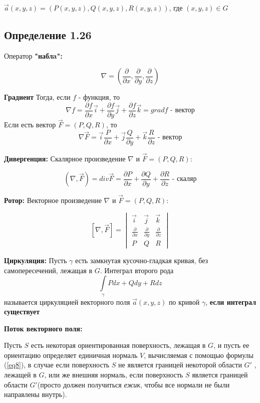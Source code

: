 \documentclass[12pt]{article}
\begin{document}
	$\vec{a}(x,y,z) = (P(x,y,z) , Q(x,y,z), R(x,y,z))$, где $(x,y,z) \in G$
	
\subsection*{Определение 1.26}
Оператор \textbf{"наблa":}
	
	

	$$\nabla = ( \frac{\partial}{\partial x} ,  \frac{\partial}{\partial y} , \frac{\partial}{\partial z})$$
	
\textbf{Градиент}
	Тогда, если $f$ - функция, то  
	$$\nabla f =   \frac{\partial f}{\partial x} \vec{i} +  \frac{\partial f}{\partial y}\vec{j} + \frac{\partial f}{\partial z} \vec{k}= grad f \text{ - вектор}$$ 
 	Если есть вектор $\vec{F} = (P, Q, R)$, то
 		$$\nabla \vec{F} = \vec{i}  \frac{P}{\partial x} + \vec{j} \frac{Q}{\partial y} + \vec{k}\frac{R}{\partial z} \text{ - вектор}$$ 
	
\textbf{Дивергенция:}
	Скалярное произведение $\nabla $ и  $\vec{F}= (P , Q , R)$:
	
	$$(\nabla , \vec{F}) = div \vec{F} = \frac{\partial P}{\partial x} + \frac{\partial Q}{\partial y} + \frac{\partial R}{\partial z} \text{ - скаляр}$$ 

\textbf{Ротор:}
	Векторное произведение $\nabla $ и  $\vec{F}= (P , Q , R)$:

$$
[\nabla ,\vec{F}] = 
\begin{vmatrix}
\vec{i} & \vec{j} & \vec{k} \\
\frac{\partial}{\partial x} & \frac{\partial}{\partial y}& \frac{\partial}{\partial z} \\
P & Q & R
\end{vmatrix}
$$

\textbf{Циркуляция:}
	Пусть $\gamma$ есть замкнутая кусочно-гладкая кривая, без самопересечений,
лежащая в $G$. Интеграл второго рода 
	$$\int\limits_{\gamma} P dx + Q dy + R dz$$
называется циркуляцией векторного поля $\vec{a}(x, y, z)$ по кривой $\gamma$, \textbf{если интеграл существует}

\textbf{Поток векторного поля:}

	Пусть $S$ есть некоторая ориентированная поверхность, лежащая в $G$,
и пусть ее ориентацию определяет единичная нормаль 
$V$, вычисляемая с помощью формулы (\ref{eq8}), в случае если поверхность $S$ не является границей некоторой области $G'$
, лежащей в $G$, или же внешняя нормаль, если
поверхность $S$ является границей области $G'$(просто должен получиться \textit{ежик}, чтобы все нормали не были направлены внутрь).
 
\end{document}
